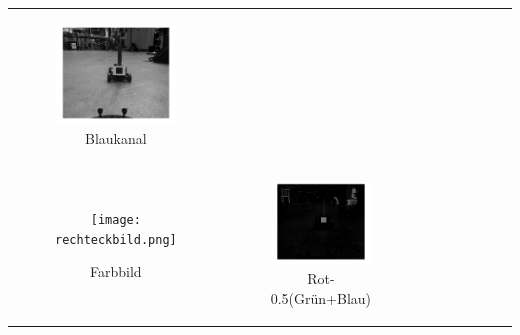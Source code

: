 \begin{center}
\begin{table}[ht]
\begin{tabular}{c c c}
\begin{subfigure}{0.3\textwidth}
\includegraphics[scale=0.08]{blaukanal.png} \vspace{-3.5mm}\caption{Blaukanal}
\end{subfigure}\\ 
\begin{subfigure}{0.3\textwidth}\centering

\texttt{[image: rechteckbild.png]} \vspace{-3.5mm}\caption{Farbbild}
\end{subfigure}&\begin{subfigure}{0.3\textwidth}\centering

\includegraphics[scale=0.08]{r-g-b.png}  
\vspace{-3.5mm}\caption{Rot-0.5(Grün+Blau)}
\end{subfigure}&\begin{subfigure}{0.3\textwidth}\centering


\end{subfigure}
\end{tabular}
\end{table}
\end{center}
